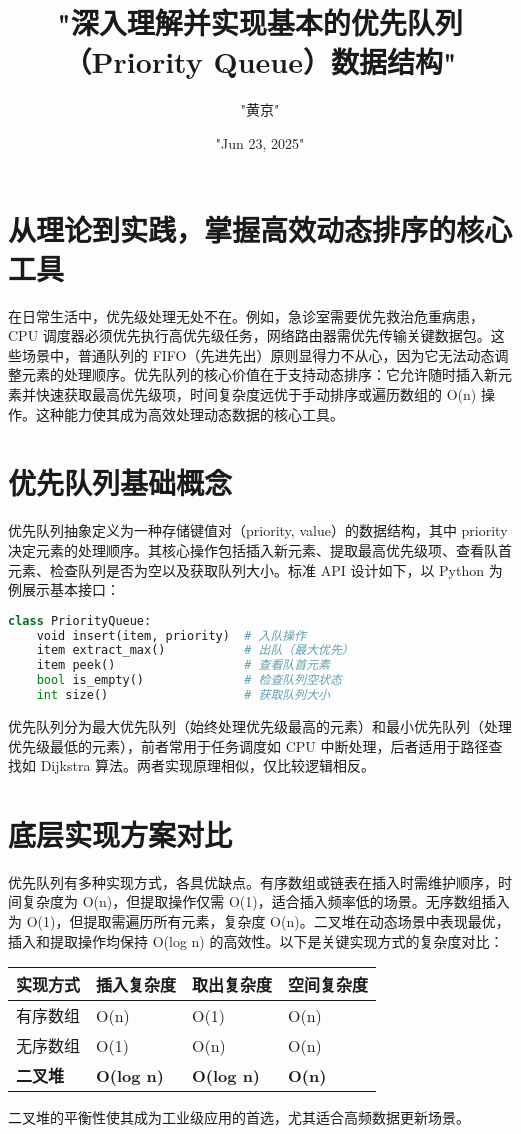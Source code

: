 \title{"深入理解并实现基本的优先队列（Priority Queue）数据结构"}
\author{"黄京"}
\date{"Jun 23, 2025"}
\maketitle
\chapter{从理论到实践，掌握高效动态排序的核心工具}
在日常生活中，优先级处理无处不在。例如，急诊室需要优先救治危重病患，CPU 调度器必须优先执行高优先级任务，网络路由器需优先传输关键数据包。这些场景中，普通队列的 FIFO（先进先出）原则显得力不从心，因为它无法动态调整元素的处理顺序。优先队列的核心价值在于支持动态排序：它允许随时插入新元素并快速获取最高优先级项，时间复杂度远优于手动排序或遍历数组的 O(n) 操作。这种能力使其成为高效处理动态数据的核心工具。\par
\chapter{优先队列基础概念}
优先队列抽象定义为一种存储键值对（priority, value）的数据结构，其中 priority 决定元素的处理顺序。其核心操作包括插入新元素、提取最高优先级项、查看队首元素、检查队列是否为空以及获取队列大小。标准 API 设计如下，以 Python 为例展示基本接口：\par
\begin{lstlisting}[language=python]
class PriorityQueue:
    void insert(item, priority)  # 入队操作
    item extract_max()           # 出队（最大优先）
    item peek()                  # 查看队首元素
    bool is_empty()              # 检查队列空状态
    int size()                   # 获取队列大小
\end{lstlisting}
优先队列分为最大优先队列（始终处理优先级最高的元素）和最小优先队列（处理优先级最低的元素），前者常用于任务调度如 CPU 中断处理，后者适用于路径查找如 Dijkstra 算法。两者实现原理相似，仅比较逻辑相反。\par
\chapter{底层实现方案对比}
优先队列有多种实现方式，各具优缺点。有序数组或链表在插入时需维护顺序，时间复杂度为 O(n)，但提取操作仅需 O(1)，适合插入频率低的场景。无序数组插入为 O(1)，但提取需遍历所有元素，复杂度 O(n)。二叉堆在动态场景中表现最优，插入和提取操作均保持 O(log n) 的高效性。以下是关键实现方式的复杂度对比：\par
\begin{table}[H]
\centering
\begin{tabular}{|l|l|l|l|}
\hline
实现方式 & 插入复杂度 & 取出复杂度 & 空间复杂度 \\
\hline
有序数组 & O(n) & O(1) & O(n) \\
\hline
无序数组 & O(1) & O(n) & O(n) \\
\hline
\textbf{二叉堆} & \textbf{O(log n)} & \textbf{O(log n)} & \textbf{O(n)} \\
\hline
\end{tabular}
\end{table}
二叉堆的平衡性使其成为工业级应用的首选，尤其适合高频数据更新场景。\par
